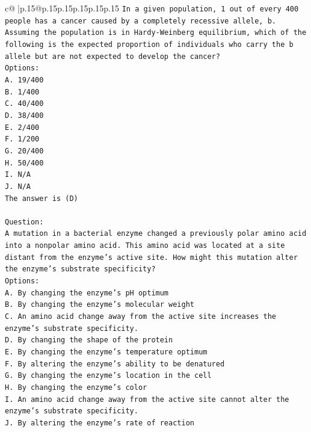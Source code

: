 \documentclass{article}
\begin{document}
{\begin{supertabular}{c@{$\;$}|p{.15\linewidth}@{}p{.15\linewidth}p{.15\linewidth}p{.15\linewidth}p{.15\linewidth}p{.15\linewidth}}
{{{\texttt{In a given population, 1 out of every 400 people has a cancer caused by a completely recessive allele, b. Assuming the population is in Hardy{-}Weinberg equilibrium, which of the following is the expected proportion of individuals who carry the b allele but are not expected to develop the cancer?} \\
\texttt{Options:} \\
\texttt{A. 19/400} \\
\texttt{B. 1/400} \\
\texttt{C. 40/400} \\
\texttt{D. 38/400} \\
\texttt{E. 2/400} \\
\texttt{F. 1/200} \\
\texttt{G. 20/400} \\
\texttt{H. 50/400} \\
\texttt{I. N/A} \\
\texttt{J. N/A} \\
\texttt{The answer is (D)} \\
\\ 
\texttt{Question:} \\
\texttt{A mutation in a bacterial enzyme changed a previously polar amino acid into a nonpolar amino acid. This amino acid was located at a site distant from the enzyme’s active site. How might this mutation alter the enzyme’s substrate specificity?} \\
\texttt{Options:} \\
\texttt{A. By changing the enzyme’s pH optimum} \\
\texttt{B. By changing the enzyme's molecular weight} \\
\texttt{C. An amino acid change away from the active site increases the enzyme's substrate specificity.} \\
\texttt{D. By changing the shape of the protein} \\
\texttt{E. By changing the enzyme's temperature optimum} \\
\texttt{F. By altering the enzyme's ability to be denatured} \\
\texttt{G. By changing the enzyme’s location in the cell} \\
\texttt{H. By changing the enzyme's color} \\
\texttt{I. An amino acid change away from the active site cannot alter the enzyme’s substrate specificity.} \\
\texttt{J. By altering the enzyme's rate of reaction} \\
}}}
\end{supertabular}}
\end{document}
